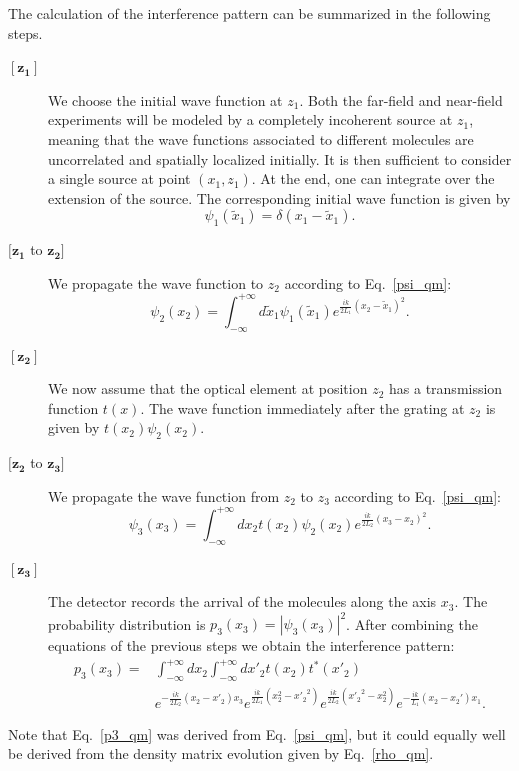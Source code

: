 \documentclass[12pt,groupedaddress,pra,aps]{revtex4-1}
\begin{document}
The calculation of the interference pattern can be summarized in the following steps. 
\begin{description}
\item[$\boldsymbol{[z_1]}$] We choose the initial wave function at $z_1$. Both the far-field and near-field experiments will be modeled by a completely incoherent source at $z_1$, meaning that the wave functions associated to different molecules are uncorrelated and spatially localized initially. It is then sufficient to consider a single source at point $(x_1, z_1)$. At the end, one can integrate over the extension of the source. The corresponding initial wave function is given by
\begin{equation}\label{eq1qm}
\psi_1(\tilde{x}_1)=\delta(x_1-\tilde{x}_1).
\end{equation}
\item[ $\boldsymbol{[z_1}$ to $\boldsymbol{z_2]}$] We propagate the wave function to $z_2$ according to Eq.~\eqref{psi_qm}:
\begin{equation}\label{eq2qm}
\psi_2(x_2)=\int_{-\infty}^{+\infty} d\tilde{x}_1 \psi_1(\tilde{x}_1) e^{\frac{ik}{2L_1}(x_2-\tilde{x}_1)^2}.
\end{equation}
\item[$\boldsymbol{[z_2]}$] We now assume that the optical element at position $z_2$ has a transmission function $t(x)$. The wave function immediately after the grating at $z_2$ is given by $ t(x_2)\psi_2(x_2)$.
\item[$\boldsymbol{[z_2}$ to $\boldsymbol{z_3]}$] We propagate the wave function from $z_2$ to $z_3$ according to Eq.~\eqref{psi_qm}: 
\begin{equation}\label{eq3qm}
\psi_3(x_3)=\int_{-\infty}^{+\infty} dx_2 t(x_2)\psi_2(x_2) e^{\frac{ik}{2L_2}(x_3-x_2)^2}.
\end{equation}
\item[$\boldsymbol{[z_3]}$] The detector records the arrival of the molecules along the axis $x_3$. The probability distribution is $p_3(x_3)=|\psi_3(x_3)|^2$. After combining the equations of the previous steps we obtain the interference pattern:
\begin{equation}\label{p3_qm}
\begin{split}
 p_3(x_3)= &\int_{-\infty}^{+\infty} dx_2 \int_{-\infty}^{+\infty}  dx'_2 t(x_2)t^{*}(x'_2)\\
& e^{-\frac{ik}{2L_2}(x_2-x'_2)x_3} 
 e^{\frac{ik}{2L_1}(x_2^2-{x'_2}^2)}e^{\frac{ik}{2L_2}({x'_2}^2-x_2^2)} e^{-\frac{ik}{L_1}(x_2-x_2')x_1}.
\end{split}
\end{equation}
\end{description}
Note that Eq.~\eqref{p3_qm} was derived from Eq.~\eqref{psi_qm}, but it could equally well be derived from the density matrix evolution given by Eq.~\eqref{rho_qm}. 
\end{document}
